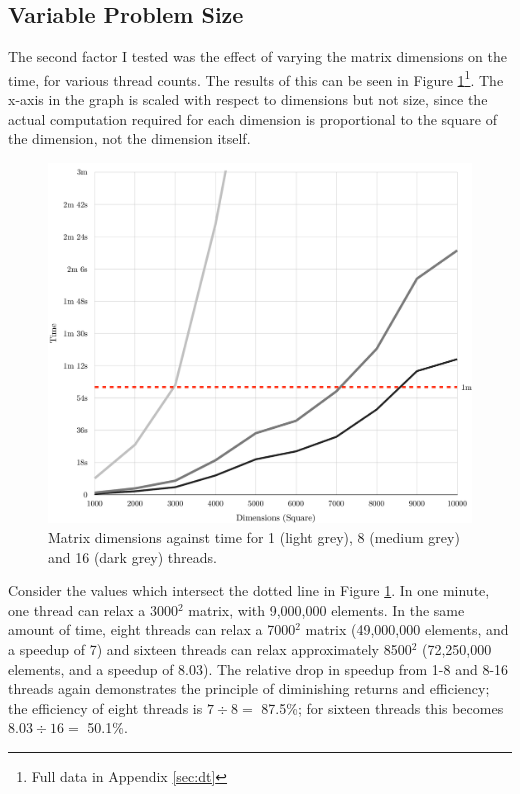 \documentclass[12pt]{article}
\begin{document}
\subsection{Variable Problem Size}

The second factor I tested was the effect of varying the matrix dimensions on the time, for various thread counts. The results of this can be seen in Figure \ref{fig:dimension}\footnote{Full data in Appendix \ref{sec:dt}}. The x-axis in the graph is scaled with respect to dimensions but not size, since the actual computation required for each dimension is proportional to the square of the dimension, not the dimension itself.

\begin{figure}[h!]
	\hspace{-0.5cm}\includegraphics[width=1.05\textwidth]{img/dimension-time}
	\caption{Matrix dimensions against time for 1 (light grey), 8 (medium grey) and 16 (dark grey) threads.}
	\label{fig:dimension}
\end{figure}

Consider the values which intersect the dotted line in Figure \ref{fig:dimension}. In one minute, one thread can relax a 3000$^2$ matrix, with 9,000,000 elements. In the same amount of time, eight threads can relax a 7000$^2$ matrix (49,000,000 elements, and a speedup of 7) and sixteen threads can relax approximately 8500$^2$ (72,250,000 elements, and a speedup of 8.03). The relative drop in speedup from 1-8 and 8-16 threads again demonstrates the principle of diminishing returns and efficiency; the efficiency of eight threads is $7\div{}8=$ 87.5\%; for sixteen threads this becomes $8.03\div{}16=$ 50.1\%.
\end{document}
